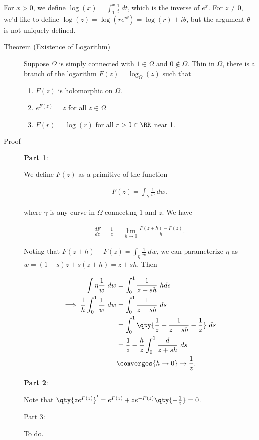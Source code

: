 For \(x>0\), we define \(\log(x) = \int_1^x \frac 1 t ~dt\), which is
the inverse of \(e^x\). For \(z\neq 0\), we'd like to define
\(\log(z) = \log(re^{i\theta}) = \log(r) + i \theta\), but the argument
\(\theta\) is not uniquely defined.

\begin{description}
\item[Theorem (Existence of Logarithm)]
Suppose \(\Omega\) is simply connected with \(1\in \Omega\) and
\(0\not\in\Omega\). Thin in \(\Omega\), there is a branch of the
logarithm \(F(z) = \log_\Omega(z)\) such that

\begin{enumerate}
\def\labelenumi{\arabic{enumi}.}
\tightlist
\item
  \(F(z)\) is holomorphic on \(\Omega\).
\item
  \(e^{F(z)} = z\) for all \(z\in \Omega\)
\item
  \(F(r) = \log(r)\) for all \(r>0\in \RR\) near 1.
\end{enumerate}
\item[Proof]
\textbf{Part 1}:

We define \(F(z)\) as a primitive of the function

\begin{align*}
F(z) = \int_\gamma \frac 1 w ~dw
.\end{align*}

where \(\gamma\) is any curve in \(\Omega\) connecting \(1\) and \(z\).
We have

\begin{align*}
\frac{dF}{dz} = \frac 1 z = \lim_{h\to 0} \frac{F(z+h) - F(z)}{h}
.\end{align*}

Noting that \(F(z+h) - F(z) = \int_\eta \frac 1 w ~dw\), we can
parameterize \(\eta\) as \(w = (1-s) z + s(z+h) = z + sh\). Then

\begin{align*}
\int\eta \frac{1} {w} ~dw &= \int_0^1 \frac{1}{z+sh} ~hds \\
\implies \frac{1} {h} \int_0^1 \frac {1} {w} ~dw 
&= \int_0^1 \frac{1}{z + sh} ~ds \\
&= \int_0^1 \qty{\frac {1} {z} + \frac{1}{z + sh} - \frac {1} {z} }~ds \\
&= \frac {1} {z} - \frac {h} {z} \int_0^1 \frac{d}{z+sh} ~ds \\
&\converges{h\to 0}\to \frac {1} {z}
.\end{align*}

\textbf{Part 2}:

Note that
\(\qty{ z e^{F(z)} }' = e^{F(z)} +ze^{-F(z)} \qty{- \frac 1 z } = 0\).

Part 3:

To do.
\end{description}

